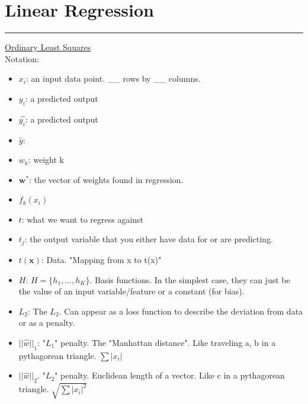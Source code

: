 \section{Linear Regression}
\smallskip \hrule height 2pt \smallskip

\underline{Ordinary Least Squares} \hfill \\

Notation:
\begin{itemize}
	\item \textbf{$x_i$}: an input data point.  \_\_ rows by \_\_ columns. 
	\item \textbf{$y_i$}: a predicted output
	\item \textbf{$\widehat{y_i}$}: a predicted output
	\item \textbf{$\widehat{y}$}: 
	\item \textbf{$w_k$}: weight k
	\item \textbf{$\bm{w}^*$}: the vector of weights found in regression.   
	\item \textbf{$f_k(x_i)$}
	\item \textbf{$t$}: what we want to regress against
	\item \textbf{$t_j$}: the output variable that you either have data for or are predicting. 
	\item \textbf{$t(\bm{x})$}: Data.  "Mapping from x to t(x)"
	\item \textbf{$H$}: $H = \{ h_1, \dots, h_K \}$.  Basis functions.  In the simplest case, they can just be the value of an input variable/feature or a constant (for bias).  
	\item \textbf{$L_2$}: The $L_2$.  Can appear as a loss function to describe the deviation from data or as a penalty.  
	\item \textbf{$ || \widehat{w} ||_1$}: "$L_1$" penalty.  The "Manhattan distance".  Like traveling a, b in a pythagorean triangle.  $\sum |x_i|$
	\item \textbf{$ || \widehat{w} ||_2$}.  "$L_2$" penalty.  Euclidean length of a vector.  Like c in a pythagorean triangle.  $\sqrt{\sum |x_i|^2}$	
\end{itemize}

